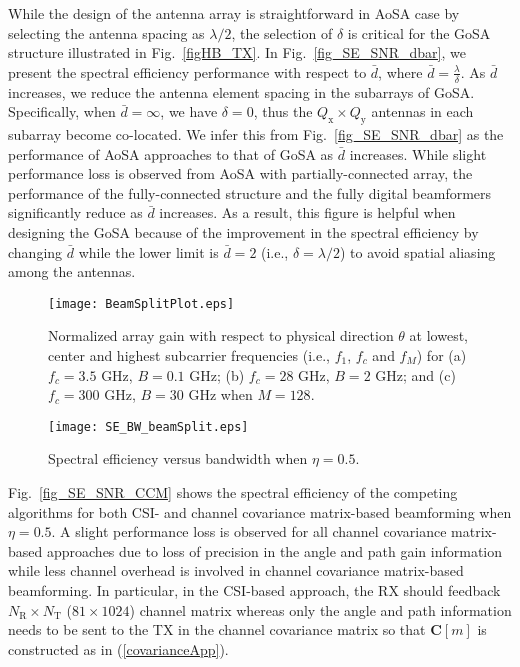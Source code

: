 \documentclass[journal,10pt]{IEEEtran}
\begin{document}
	While the design of the antenna array is straightforward in AoSA case by selecting the antenna spacing as $\lambda/2$, the selection of $\delta$ is critical for the GoSA structure illustrated in Fig.~\ref{figHB_TX}. In Fig.~\ref{fig_SE_SNR_dbar}, we present the spectral efficiency performance with respect to $\bar{d}$, where $\bar{d} = \frac{\lambda}{\delta}$. As $\bar{d}$ increases, we reduce the antenna element spacing in the subarrays of GoSA. Specifically, when $\bar{d} = \infty$, we have $\delta = 0$, thus the $Q_\mathrm{x}\times Q_\mathrm{y}$ antennas in each subarray become co-located. We infer this from Fig.~\ref{fig_SE_SNR_dbar} as the performance of AoSA approaches to that of GoSA as $\bar{d}$ increases. While slight performance loss is observed from AoSA with partially-connected array, the performance of the fully-connected structure and the fully digital beamformers significantly reduce as $\bar{d}$ increases. As a result, this figure is helpful when designing the GoSA because of the improvement in the spectral efficiency by changing $\bar{d}$ while the lower limit is $\bar{d}=2$ (i.e., $\delta = \lambda/2$) to avoid spatial aliasing among the antennas. 
	
	
	\begin{figure}[t]
		\centering
		{\texttt{[image: BeamSplitPlot.eps]} } 
		\caption{\color{black}Normalized array gain with respect to physical direction $\theta$ at lowest, center and highest subcarrier frequencies (i.e., $f_1$, $f_c$ and $f_M$) for (a) $f_c = 3.5$ GHz, $B = 0.1$ GHz; (b) $f_c = 28$ GHz, $B = 2$ GHz; and (c) $f_c=300$ GHz, $B = 30$ GHz when $M = 128$. 
		}
		\label{fig_BeamSplit}
	\end{figure}
	
	
	
	\begin{figure}[t]
		\centering
		{\texttt{[image: SE\_BW\_beamSplit.eps]} } 
		\caption{\color{black}Spectral efficiency versus bandwidth when $\eta = 0.5$. 
		}
		\label{fig_SE_SNR_BeamSplit}
	\end{figure}
	
	
	Fig.~\ref{fig_SE_SNR_CCM} shows the spectral efficiency of the competing algorithms for both CSI- and channel covariance matrix-based beamforming when $\eta = 0.5$. A slight performance loss is observed for all channel covariance matrix-based approaches due to loss of precision in the angle and path gain information while less channel overhead is involved in channel covariance matrix-based beamforming. In particular, in the CSI-based approach, the RX should feedback $N_\mathrm{R}\times N_\mathrm{T}$ ($81\times1024 $) channel matrix whereas only the angle and path information needs to be sent to the TX in the channel covariance matrix so that $\mathbf{C}[m]$ is constructed as in (\ref{covarianceApp}).
	
\end{document}
